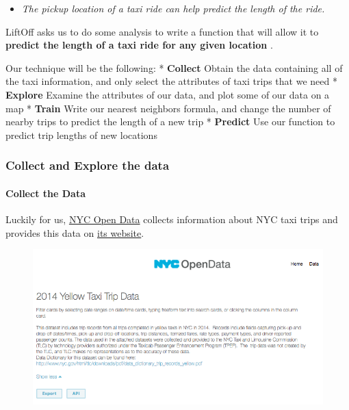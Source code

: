 \documentclass[11pt]{article}
\makeatletter
\def\maxwidth{\ifdim\Gin@nat@width>\linewidth\linewidth
    \else\Gin@nat@width\fi}
\let\Oldincludegraphics\includegraphics
\renewcommand{\includegraphics}[1]{\Oldincludegraphics[width=.8\maxwidth]{#1}}
\providecommand{\tightlist}{%
      \setlength{\itemsep}{0pt}\setlength{\parskip}{0pt}}
\makeatother
\begin{document}
\begin{itemize}
\tightlist
\item
  \emph{The pickup location of a taxi ride can help predict the length
  of the ride.}
\end{itemize}

LiftOff asks us to do some analysis to write a function that will allow
it to \textbf{predict the length of a taxi ride for any given location
}.

Our technique will be the following: * \textbf{Collect} Obtain the data
containing all of the taxi information, and only select the attributes
of taxi trips that we need * \textbf{Explore} Examine the attributes of
our data, and plot some of our data on a map * \textbf{Train} Write our
nearest neighbors formula, and change the number of nearby trips to
predict the length of a new trip * \textbf{Predict} Use our function to
predict trip lengths of new locations

    \subsubsection{Collect and Explore the
data}\label{collect-and-explore-the-data}

    \paragraph{Collect the Data}\label{collect-the-data}

    Luckily for us, \href{https://opendata.cityofnewyork.us/}{NYC Open Data}
collects information about NYC taxi trips and provides this data on
\href{https://data.cityofnewyork.us/Transportation/2014-Yellow-Taxi-Trip-Data/gn7m-em8n}{its
website}.

    \begin{figure}
\centering
\includegraphics{./nyc-taxi.png}
\caption{}
\end{figure}
\end{document}

